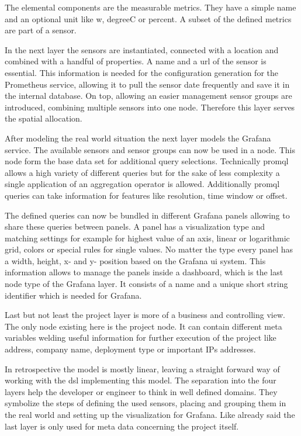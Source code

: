 The elemental components are the measurable metrics. They have a simple name and an optional unit like \gls{w}, \gls{degreeC} or \gls{percent}. A subset of the defined metrics are part of a sensor.

In the next layer the sensors are instantiated, connected with a location and combined with a handful of properties. A name and a \gls{url} of the sensor is essential. This information is needed for the configuration generation for the Prometheus service, allowing it to pull the sensor date frequently and save it in the internal database. On top, allowing an easier management sensor groups are introduced, combining multiple sensors into one node. Therefore this layer serves the spatial allocation. 

After modeling the real world situation the next layer models the Grafana service. The available sensors and sensor groups can now be used in a  node. This node form the base data set for additional query selections. Technically \gls{promql} allows a high variety of different queries but for the sake of less complexity a single application of an aggregation operator is allowed. Additionally \gls{promql} queries can take information for features like resolution, time window or offset. 

The defined queries can now be bundled in different Grafana panels allowing to share these queries between panels. A panel has a visualization type and matching settings for example for highest value of an axis, linear or logarithmic grid, colors or special rules for single values. No matter the type every panel has a width, height, x- and y- position based on the Grafana \gls{ui} system. This information allows to manage the panels inside a dashboard, which is the last node type of the Grafana layer. It consists of a name and a unique short string identifier which is needed for Grafana. 

Last but not least the project layer is more of a business and controlling view. The only node existing here is the project node. It can contain different meta variables welding useful information for further execution of the project like address, company name, deployment type or important \glspl{IP} addresses. 

In retrospective the model is mostly linear, leaving a straight forward way of working with the \gls{dsl} implementing this model. The separation into the four layers help the developer or engineer to think in well defined domains. They symbolize the steps of defining the used sensors, placing and grouping them in the real world and setting up the visualization for Grafana. Like already said the last layer is only used for meta data concerning the project itself.


